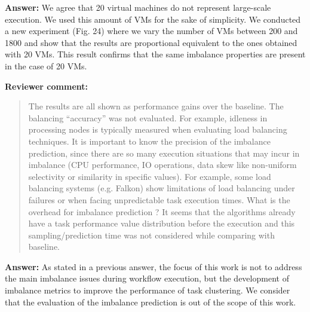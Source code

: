 \documentclass{letter}
\newenvironment{review}%
{\textbf{Reviewer comment:}\begin{quote}}%
{\end{quote}}%
\newcommand{\answer}[1]{%
      \textbf{Answer:} #1}
\begin{document}
\begin{letter}{}
\answer{We agree that 20 virtual machines do not represent large-scale execution. We used this amount of VMs for the sake of simplicity. We conducted a new experiment (Fig. 24) where we vary the number of VMs between 200 and 1800 and show that the results are proportional equivalent to the ones obtained with 20 VMs. This result confirms that the same imbalance properties are present in the case of 20 VMs.}


\begin{review}
The results are all shown as performance gains over the baseline. The balancing ``accuracy'' was not evaluated. For example, idleness in processing nodes is typically measured when evaluating load balancing techniques. It is important to know the precision of the imbalance prediction, since there are so many execution situations that may incur in imbalance (CPU performance, IO operations, data skew like non-uniform selectivity or similarity in specific values). For example, some load balancing systems (e.g. Falkon) show limitations of load balancing under failures or when facing unpredictable task execution times. What is the overhead for imbalance prediction ? It seems that the algorithms already have a task performance value distribution before the execution and this sampling/prediction time was not considered while comparing with baseline.
\end{review}

\answer{As stated in a previous answer, the focus of this work is not to address the main imbalance issues during workflow execution, but the development of imbalance metrics to improve the performance of task clustering. We consider that the evaluation of the imbalance prediction is out of the scope of this work.}



\end{letter}
\end{document}
